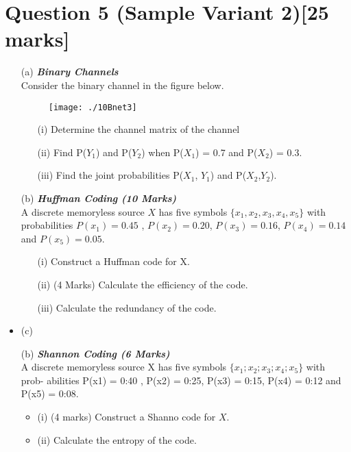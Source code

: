 \documentclass[]{article}
\begin{document}
\section{Question 5 (Sample Variant 2)[25 marks]}

\begin{itemize}
\item[(a)] \textbf{\textit{Binary Channels }}\\

Consider the binary channel in the figure below.
\begin{figure}[h!]
\centering
\texttt{[image: ./10Bnet3]}
\caption{}
\label{fig:10Bnet3}
\end{figure}

\begin{itemize}
\item[(i)]  Determine the channel matrix of the channel
\item[(ii)]   Find P($Y_1$) and P($Y_2$) when P($X_1$) = 0.7 and P($X_2$) = 0.3.
\item[(iii)]   Find the joint probabilities P($X_1$, $Y_1$) and P($X_2$,$Y_2$).
\end{itemize}

\item[(b)] \textbf{\textit{Huffman Coding (10 Marks)}}\\
A discrete memoryless source $X$ has five symbols $\{x_1,x_2,x_3,x_4,x_5\}$ with probabilities $P(x_1) = 0.45$ , $P(x_2) = 0.20$, $P(x_3) = 0.16$, $P(x_4) = 0.14$ and $P(x_5) = 0.05$.

\begin{itemize}
\item[(i)]  Construct a Huffman code for X.
\item[(ii)] (4 Marks) Calculate the efficiency of the code.
\item[(iii)]  Calculate the redundancy of the code.
\end{itemize}

\item(c) \item[(b)] \textbf{\textit{Shannon Coding (6 Marks)}}\\
A discrete memoryless source X has five symbols $\{x_1; x_2; x_3; x_4; x_5\}$ with prob-
abilities P(x1) = 0:40 , P(x2) = 0:25, P(x3) = 0:15, P(x4) = 0:12 and
P(x5) = 0:08.
\begin{itemize}
\item(i) (4 marks) Construct a Shanno code for $X$.
\item(ii)  Calculate the entropy of the code.
\end{itemize}



\end{itemize}
\end{document}
